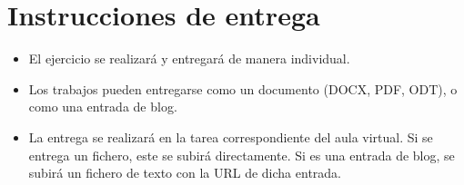 \documentclass[a4paper]{article}
\begin{document}
\section*{Instrucciones de entrega}
\label{sec:org0000012}
\begin{itemize}
\item El ejercicio se realizará y entregará de manera individual.
\item Los trabajos pueden entregarse como un documento (DOCX, PDF, ODT), o como una entrada de blog.
\item La entrega se realizará en la tarea correspondiente del aula virtual. Si se entrega un fichero, este se subirá directamente. Si es una entrada de blog, se subirá un fichero de texto con la URL de dicha entrada.
\end{itemize}
\end{document}
